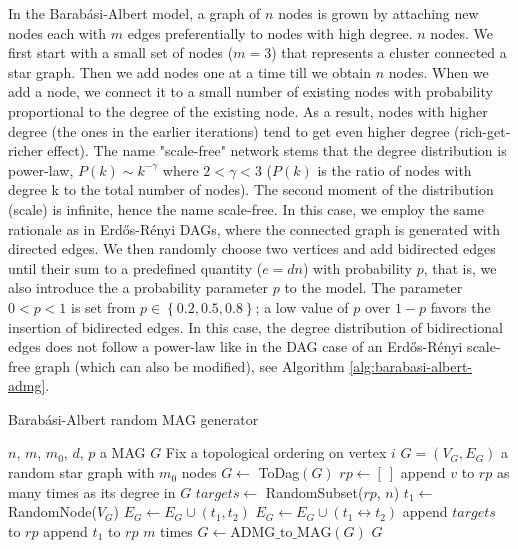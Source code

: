 \documentclass[a4paper]{article}
\begin{document}
In the Barab\'{a}si-Albert model, a graph of $n$ nodes is grown by attaching new nodes each with $m$ edges preferentially to nodes with high degree. $n$ nodes. We first start with a small set of nodes ($m=3$) that represents a cluster connected a star graph. Then we add nodes one at a time till we obtain $n$ nodes. When we add a node, we connect it to a small number of existing nodes with probability proportional to the degree of the existing node. As a result, nodes with higher degree (the ones in the earlier iterations) tend to get even higher degree (rich-get-richer effect). The name "scale-free" network stems that the degree distribution is power-law, $P(k) \sim k^{-\gamma}$ where $2 < \gamma < 3$ ($P(k)$ is the ratio of nodes with degree k to the total number of nodes). The second moment of the distribution (scale) is infinite, hence the name scale-free. In this case, we employ the same rationale as in Erd\H{o}s-R\'{e}nyi DAGs, where the connected graph is generated with directed edges. We then randomly choose two vertices and add bidirected edges until their sum to a predefined quantity ($e=dn$) with probability $p$, that is, we also introduce the a probability parameter $p$ to the model. The parameter $0 < p < 1$ is set from $p \in \left\{ 0.2, 0.5, 0.8 \right\}$; a low value of $p$ over $1-p$ favors the insertion of bidirected edges. In this case, the degree distribution of bidirectional edges does not follow a power-law like in the DAG case of an Erd\H{o}s-R\'{e}nyi scale-free graph (which can also be modified), see Algorithm \ref{alg:barabasi-albert-admg}. 

\begin{algorithm}
	\caption{Barabási-Albert random MAG generator}
	\label{alg:barabasi-albert-admg}
	\begin{algorithmic}[1]
		\renewcommand{\algorithmicrequire}{\textbf{Input:}}
		\renewcommand{\algorithmicensure}{\textbf{Output:}}
		\Require $n$, $m$, $m_0$, $d$, $p$
		\Ensure a MAG $G$
		\State Fix a topological ordering on vertex $i$
		\EndFor
		\State $G = (V_G, E_G) $ a random star graph with $m_0$ nodes
		\State $G \leftarrow$ ToDag$(G)$ 
		\State $rp \leftarrow [ \ ]$ 
		\State append $v$ to $rp$ as many times as its degree in $G$
		\EndFor
		\State $targets \leftarrow$ RandomSubset($rp$, $n$)
		\State $t_1 \leftarrow$ RandomNode($V_G$)
		\State $E_G \leftarrow E_G \cup (t_1, t_2)$
		\Else
		\State $E_G \leftarrow E_G \cup (t_1 \leftrightarrow t_2)$
		\EndIf
		\EndIf
		\EndFor
		\State append $targets$ to $rp$
		\State append $t_1$ to $rp$ $m$ times
		\EndWhile
		\State $G \leftarrow \text{ADMG\_to\_MAG}(G)$
		\State \Return $G$ 
	\end{algorithmic} 
\end{algorithm}
\end{document}
